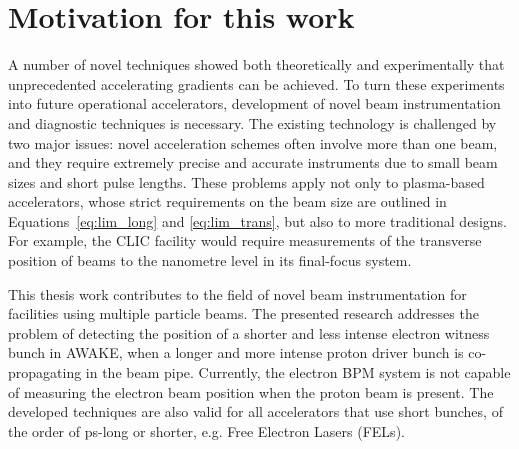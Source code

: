 \section{Motivation for this work}

A number of novel techniques showed both theoretically and experimentally that unprecedented accelerating gradients can be achieved. To turn these experiments into future operational accelerators, development of novel beam instrumentation and diagnostic techniques is necessary. The existing technology is challenged by two major issues: novel acceleration schemes often involve more than one beam, and they require extremely precise and accurate instruments due to small beam sizes and short pulse lengths. These problems apply not only to plasma-based accelerators, whose strict requirements on the beam size are outlined in Equations~\ref{eq:lim_long} and \ref{eq:lim_trans}, but also to more traditional designs. For example, the CLIC facility would require measurements of the transverse position of beams to the nanometre level in its final-focus system.

This thesis work contributes to the field of novel beam instrumentation for facilities using multiple particle beams. The presented research addresses the problem of detecting the position of a shorter and less intense electron witness bunch in AWAKE, when a longer and more intense proton driver bunch is co-propagating in the beam pipe. Currently, the electron BPM system is not capable of measuring the electron beam position when the proton beam is present. The developed techniques are also valid for all accelerators that use short bunches, of the order of ps-long or shorter, e.g. Free Electron Lasers (FELs).
